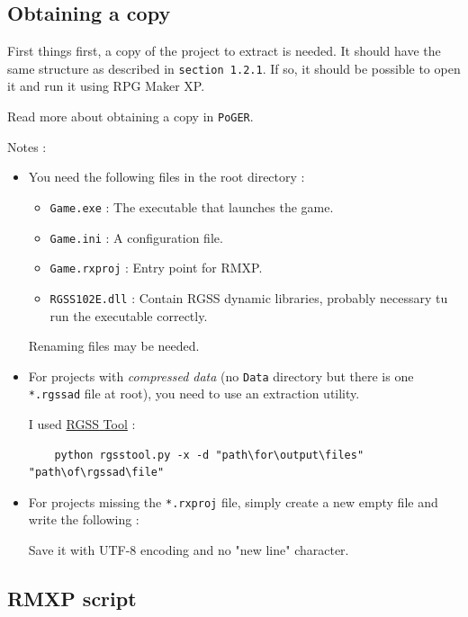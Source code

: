 \documentclass[11pt]{article}
\begin{document}
\subsection{Obtaining a copy}

First things first, a copy of the project to extract is needed. It should have the same structure as described in \verb|section 1.2.1|. If so, it should be possible to open it and run it using RPG Maker XP.

Read more about obtaining a copy in \verb|PoGER|.

Notes :

\begin{itemize}
	\item You need the following files in the root directory :
	
	\begin{itemize}
		\item \verb|Game.exe| : The executable that launches the game.
		\item \verb|Game.ini| : A configuration file.
		\item \verb|Game.rxproj| : Entry point for RMXP.
		\item \verb|RGSS102E.dll| : Contain RGSS dynamic libraries, probably necessary tu run the executable correctly.
	\end{itemize}

	Renaming files may be needed.
	
	\item For projects with \textit{compressed data} (no \verb|Data| directory but there is one \verb|*.rgssad| file at root), you need to use an extraction utility.
	
	I used \href{https://gitlab.com/rgss/rgsstool}{RGSS Tool} :
	
	\begin{lstlisting}
	python rgsstool.py -x -d "path\for\output\files" "path\of\rgssad\file"\end{lstlisting}
	\vspace{-6mm}
	
	\item For projects missing the \verb|*.rxproj| file, simply create a new empty file and write the following : 
	
	
	Save it with UTF-8 encoding and no "new line" character.
\end{itemize}



\subsection{RMXP script}
\end{document}
